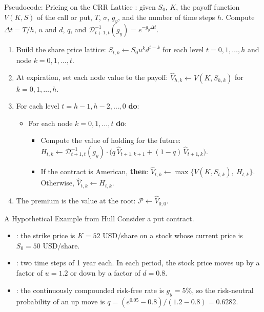\documentclass[aspectratio=169,11pt]{beamer}
\newcommand{\Dstep}{\mathcal{D}^{-1}_{t+1,t}(g_{y})}
\begin{document}
\begin{frame}{Pseudocode: Pricing on the CRR Lattice}
  : given $S_{0}$, $K$, the payoff function $V(K,S)$ of the
  call or put, $T$, $\sigma$, $g_{y}$, and the number of time steps $h$. Compute
  $\Delta t=T/h$, $u$ and $d$, $q$, and $\Dstep=e^{-g_{y}\Delta t}$.
  \begin{enumerate}\setlength{\itemsep}{0.3em}
    \item Build the share price lattice: $S_{t,k}\gets S_{0}u^{k}d^{t-k}$ for
      each level $t=0,1,\dots,h$ and node $k=0,1,\dots,t$.
    \item At expiration, set each node value to the payoff:
      $\hat{V}_{h,k}\gets V(K,S_{h,k})$ for $k=0,1,\dots,h$.
    \item For each level $t=h-1,h-2,\dots,0$ \textbf{do}:
      \begin{itemize}
        \item For each node $k=0,1,\dots,t$ \textbf{do}:
          \begin{itemize}
            \item[a.] Compute the value of holding for the future:
              $H_{t,k}\gets\Dstep\cdot\bigl(q\,\hat{V}_{t+1,k+1}+(1-q)\,\hat{V}_{t+1,k}\bigr)$.
            \item[b.] If the contract is American, \textbf{then}:
              $\hat{V}_{t,k}\gets\max\bigl\{V(K,S_{t,k}),~H_{t,k}\bigr\}$.
              Otherwise, $\hat{V}_{t,k}\gets H_{t,k}$.
          \end{itemize}
      \end{itemize}
    \item The premium is the value at the root: $\mathcal{P}\gets\hat{V}_{0,0}$.
  \end{enumerate}
\end{frame}

\begin{frame}{A Hypothetical Example from Hull}
  Consider a put contract.
  \begin{itemize}\setlength{\itemsep}{0.4em}
    \item {}: the strike price is $K=52$ USD/share on a stock
      whose current price is $S_{0}=50$ USD/share.
    \item {}: two time steps of 1 year each. In each period, the
      stock price moves up by a factor of $u=1.2$ or down by a factor of $d=0.8$.
    \item {}: the continuously compounded risk-free rate is
      $g_{y}=5\%$, so the risk-neutral probability of an up move is
      $q=(e^{0.05}-0.8)/(1.2-0.8)=0.6282$.
  \end{itemize}
  \vspace{0.6em}
  {\large\textbf{}}
\end{frame}
\end{document}
